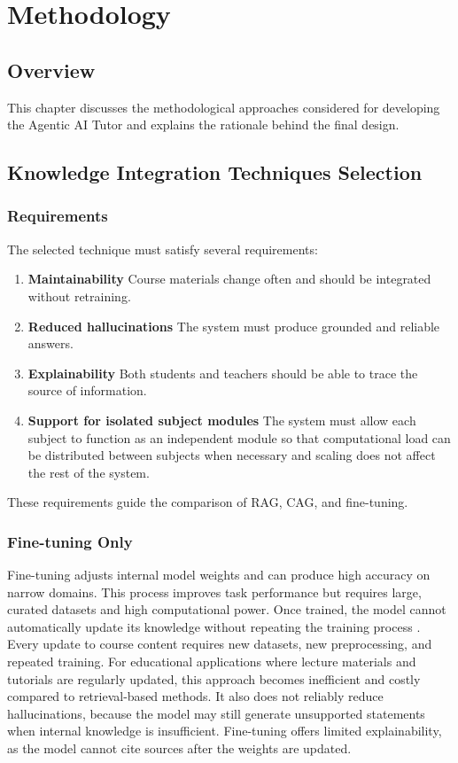 \chapter{Methodology}
\label{chap:methodology}

\section{Overview}
This chapter discusses the methodological approaches considered for developing the Agentic AI Tutor and explains the rationale behind the final design.

\section{Knowledge Integration Techniques Selection}
\subsection{Requirements}

The selected technique must satisfy several requirements:

\begin{enumerate}
    \item \textbf{Maintainability} Course materials change often and should be integrated without retraining.
    \item \textbf{Reduced hallucinations} The system must produce grounded and reliable answers.
    \item \textbf{Explainability} Both students and teachers should be able to trace the source of information.
    \item \textbf{Support for isolated subject modules} The system must allow each subject to function as an independent module so that computational load can be distributed between subjects when necessary and scaling does not affect the rest of the system.
\end{enumerate}

These requirements guide the comparison of RAG, CAG, and fine-tuning.

\subsection{Fine-tuning Only}
Fine-tuning adjusts internal model weights and can produce high accuracy on narrow domains. This process improves task performance but requires large, curated datasets and high computational power. Once trained, the model cannot automatically update its knowledge without repeating the training process \parencite{RAGvsCAG95:online}. Every update to course content requires new datasets, new preprocessing, and repeated training. For educational applications where lecture materials and tutorials are regularly updated, this approach becomes inefficient and costly compared to retrieval-based methods. It also does not reliably reduce hallucinations, because the model may still generate unsupported statements when internal knowledge is insufficient. Fine-tuning offers limited explainability, as the model cannot cite sources after the weights are updated.

